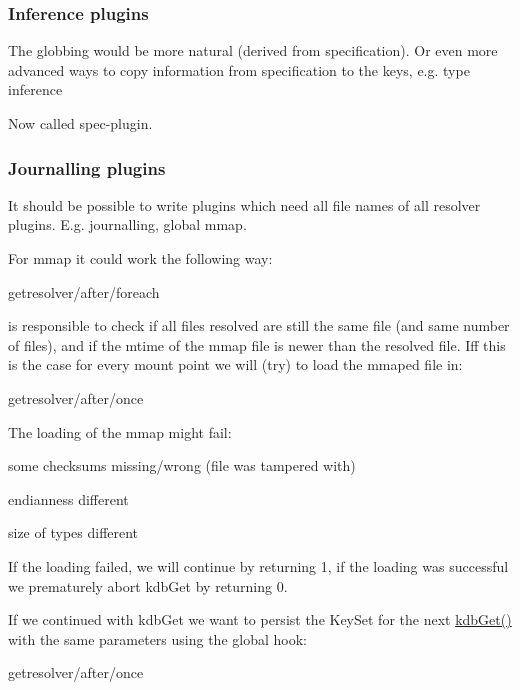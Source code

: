 \subsubsection*{Inference plugins}

The globbing would be more natural (derived from specification). Or even more advanced ways to copy information from specification to the keys, e.\+g. type inference

Now called {\ttfamily spec}-\/plugin.

\subsubsection*{Journalling plugins}

It should be possible to write plugins which need all file names of all resolver plugins. E.\+g. journalling, global mmap.

For mmap it could work the following way\+: \begin{DoxyVerb}    getresolver/after/foreach
\end{DoxyVerb}


is responsible to check if all files resolved are still the same file (and same number of files), and if the {\ttfamily mtime} of the mmap file is newer than the resolved file. Iff this is the case for every mount point we will (try) to load the mmaped file in\+: \begin{DoxyVerb}    getresolver/after/once
\end{DoxyVerb}


The loading of the mmap might fail\+:


\begin{DoxyItemize}
\item some checksums missing/wrong (file was tampered with)
\item endianness different
\item size of types different
\end{DoxyItemize}

If the loading failed, we will continue by returning 1, if the loading was successful we prematurely abort {\ttfamily kdb\+Get} by returning 0.

If we continued with {\ttfamily kdb\+Get} we want to persist the Key\+Set for the next {\ttfamily \hyperlink{group__kdb_ga28e385fd9cb7ccfe0b2f1ed2f62453a1}{kdb\+Get()}} with the same parameters using the global hook\+: \begin{DoxyVerb}    getresolver/after/once
\end{DoxyVerb}


